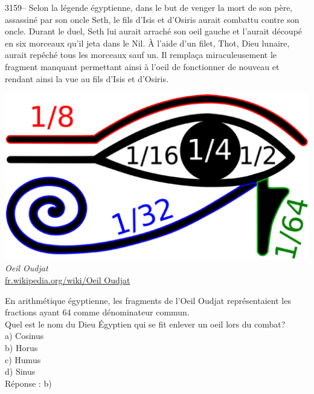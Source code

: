 \documentclass[letterpaper, 12pt]{article}
\begin{document}
3159-- Selon la l\'egende \'egyptienne, dans le but de venger la mort de son p\`ere, assassin\'e par son oncle Seth, le fils d'Isis et d'Osiris aurait combattu contre son oncle. Durant le duel, Seth lui aurait arrach\'e son oeil gauche et l'aurait d\'ecoup\'e en six morceaux qu'il jeta dans le Nil. \`A l'aide d'un filet, Thot, Dieu lunaire,  aurait rep\^ech\'e tous les morceaux sauf un. Il rempla\c ca miraculeusement le fragment manquant permettant ainsi \`a l'oeil de fonctionner de nouveau et rendant ainsi la vue au fils d'Isis et d'Osiris.
\begin{center}
\includegraphics[scale=0.15]{oeildHorus.eps}\\
\emph{{\small Oeil Oudjat}}\\
\href{http://fr.wikipedia.org/wiki/\%C5\%92il_Oudjat}{fr.wikipedia.org/wiki/Oeil Oudjat}\\
\end{center}
En arithm\'etique \'egyptienne, les fragments de l'Oeil Oudjat repr\'esentaient les fractions ayant 64 comme d\'enominateur commun.\\

Quel est le nom du Dieu \'Egyptien qui se fit enlever un oeil lors du combat?\\

a) Cosinus\\
b) Horus\\
c) Humus\\
d) Sinus\\

R\'eponse : b)\\
\end{document}

